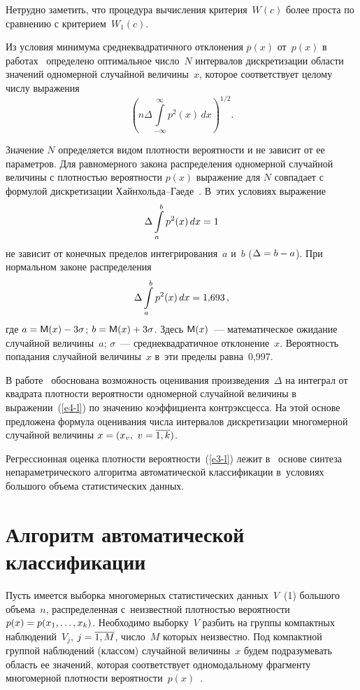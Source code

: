 \begin{multicols}{2}
  Нетрудно заметить, что процедура вычисления критерия~$W(c)$ более 
проста по сравнению с критерием~$W_1(c)$.
  
  Из условия минимума среднеквадратичного отклонения $\overline{p}(x)$ 
от~$p(x)$ в работах~\cite{10-l, 13-l} определено оптимальное число~$N$ 
интервалов дискретизации об\-ласти значений одномерной случайной 
величины~$x$, которое соответствует целому числу вы\-ра\-жения
\begin{equation}
 \left( n\Delta \int\limits_{-\infty}^\infty p^2(x)\,dx\right)^{1/2}.
 \label{e4-l}
\end{equation}
  
  Значение $N$ определяется видом плотности вероятности и не зависит от ее 
параметров. Для равномерного закона распределения одномерной случайной 
величины с плотностью вероятности $p(x)$ выражение для $N$ совпадает с 
формулой дискретизации Хайн\-холь\-да--Га\-е\-де~\cite{15-l}. В~этих 
условиях выражение 
$$
\Delta \int\limits_a^b p^2(x)\,dx\hm=1
$$
 не зависит от 
конечных пределов интегрирования~$a$ и~$b$ ($\Delta\hm= b\hm-a$). При 
нормальном законе распределения 
$$
\Delta \int\limits_a^b p^2(x)\,dx\hm= 
1{,}693\,,
$$
 где $a\hm= {\sf M}(x)\hm-3\sigma$; $b\hm= {\sf M}(x)\hm+3\sigma$. Здесь 
${\sf M}(x)$~--- математическое ожидание случайной величины~$a$; $\sigma$~--- 
среднеквадратичное отклонение~$x$. Вероятность попадания случайной 
величины~$x$ в~эти пределы равна~0,997.
  
  В работе~\cite{10-l} обоснована возможность оценивания 
произведения~$\Delta$ на интеграл от квадрата плотности вероятности 
одномерной случайной величины в выражении~(\ref{e4-l}) по значению 
коэффициента контрэксцесса. На этой основе предложена формула оценивания 
числа интервалов дискретизации многомерной случайной величины $x\hm= 
(x_v,\ v\hm=\overline{1,k})$.
  
  Регрессионная оценка плотности ве\-ро\-ят\-ности~(\ref{e3-l}) лежит в~ основе 
синтеза непараметрического алгоритма автоматической классификации в~условиях большого объема статистических данных.
  
\section{Алгоритм автоматической классификации}

Пусть имеется выборка многомерных статистических данных~$V$~(1) 
большого объема~$n$, распределенная с~неизвестной плот\-ностью ве\-ро\-ят\-ности 
$p(x)\hm= p(x_1, \ldots , x_k)$. Необходимо выборку~$V$ разбить на группы 
компактных наблюдений~$V_j$, $j\hm=\overline{1,M}$, чис\-ло~$M$ которых 
неизвестно. Под компактной группой наблюдений (классом) случайной 
величины~$x$ будем подразумевать об\-ласть ее значений, которая 
соответствует одномодальному фрагменту многомерной плот\-ности 
ве\-ро\-ят\-ности~$p(x)$~\cite{11-l, 12-l}.


\end{multicols}
